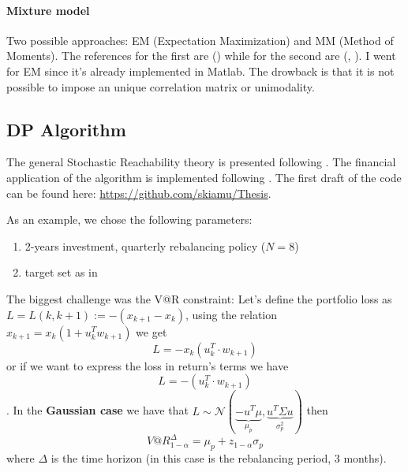 \documentclass[]{article}
\begin{document}
\paragraph{Mixture model}
Two possible approaches: EM (Expectation Maximization) and MM (Method of Moments). The references for the first are (\cite{McNiel05}) while for the second are (\cite{MM93}, \cite{MM83}). I went for EM since it's already implemented in Matlab. The drowback is that it is not possible to impose an unique correlation matrix or unimodality. 
\subsection{DP Algorithm}
The general Stochastic Reachability theory is presented following \cite{Inv}.
The financial application of the algorithm is implemented following \cite{Pola2012}.
The first draft of the code can be found here: 
\url{https://github.com/skiamu/Thesis}.

As an example, we chose the following parameters:
\begin{enumerate}
	\item 2-years investment, quarterly rebalancing policy ($N=8$)
	\item target set as in \cite{PolaNonGaussian}
\end{enumerate}
The biggest challenge was the V@R constraint:
Let's define the portfolio loss as $ L = L(k,k+1):= -(x_{k+1}-x_k) $, using the relation $ x_{k+1} = x_{k}(1+u_k^{T}w_{k+1})$ we get 
\[ L = -x_{k}(u_k^T \cdot w_{k+1})\] or if we want to express the loss in return's terms we have \[ L = -(u_k^T \cdot w_{k+1})\].
In the \textbf{Gaussian case} we have that $ L \sim \mathcal{N}(\underbrace{-u^T\mu}_{\mu_p},\underbrace{u^T\Sigma u}_{\sigma_p^2})$ then \[ V@R^\Delta_{1-\alpha} = \mu_p + z_{1-\alpha} \sigma_p\] where $\Delta$ is the time horizon (in this case is the rebalancing period, 3 months).
\end{document}
